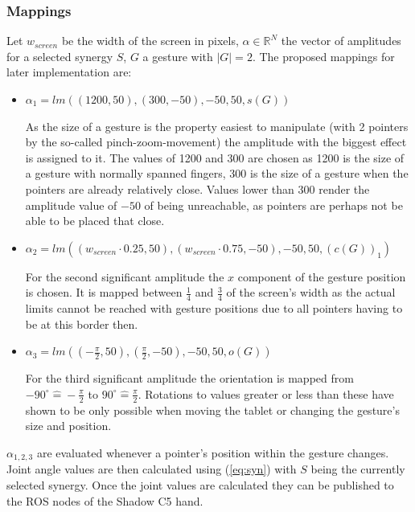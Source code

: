 \subsubsection{Mappings}

Let $w_{screen}$ be the width of the screen in pixels, $\alpha \in \mathbb{R}^N$ the vector of amplitudes for a selected synergy $S$, $G$ a gesture with $|G| = 2$. The proposed mappings for later implementation are:
\begin{itemize}
	\item $\alpha_1 = lm\left((1200, 50), (300, -50), -50, 50, s(G)\right)$
	
	As the size of a gesture is the property easiest to manipulate (with 2 pointers by the so-called pinch-zoom-movement) the amplitude with the biggest effect is assigned to it. The values of 1200 and 300 are chosen as 1200 is the size of a gesture with normally spanned fingers, 300 is the size of a gesture when the pointers are already relatively close. Values lower than 300 render the amplitude value of $-50$ of being unreachable, as pointers are perhaps not be able to be placed that close.
	
	\item $\alpha_2 = lm\left((w_{screen} \cdot 0.25, 50), (w_{screen} \cdot 0.75, -50), -50, 50, (c(G))_1\right)$
	
	For the second significant amplitude the $x$ component of the gesture position is chosen. It is mapped between $\frac{1}{4}$ and $\frac{3}{4}$ of the screen's width as the actual limits cannot be reached with gesture positions due to all pointers having to be at this border then.
	
	\item $\alpha_3 = lm\left( \left( -\frac{\pi}{2}, 50 \right), \left( \frac{\pi}{2}, -50 \right), -50, 50, o(G) \right)$
	
	For the third significant amplitude the orientation is mapped from $-90^\circ \widehat{=} -\frac{\pi}{2}$ to $90^\circ \widehat{=} \frac{\pi}{2}$. Rotations to values greater or less than these have shown to be only possible when moving the tablet or changing the gesture's size and position.
\end{itemize}

$\alpha_{1,2,3}$ are evaluated whenever a pointer's position within the gesture changes. Joint angle values are then calculated using (\ref{eq:syn}) with $S$ being the currently selected synergy. Once the joint values are calculated they can be published to the ROS nodes of the Shadow C5 hand.

